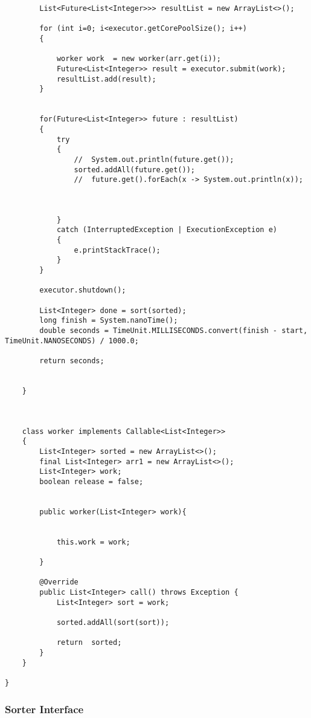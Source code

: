 \documentclass[11pt]{article}  %
\theoremstyle{definition}
\theoremstyle{remark}
\begin{document}
\begin{appendices}
\begin{lstlisting}
        List<Future<List<Integer>>> resultList = new ArrayList<>();

        for (int i=0; i<executor.getCorePoolSize(); i++)
        {

            worker work  = new worker(arr.get(i));
            Future<List<Integer>> result = executor.submit(work);
            resultList.add(result);
        }


        for(Future<List<Integer>> future : resultList)
        {
            try
            {
                //  System.out.println(future.get());
                sorted.addAll(future.get());
                //  future.get().forEach(x -> System.out.println(x));



            }
            catch (InterruptedException | ExecutionException e)
            {
                e.printStackTrace();
            }
        }

        executor.shutdown();

        List<Integer> done = sort(sorted);
        long finish = System.nanoTime();
        double seconds = TimeUnit.MILLISECONDS.convert(finish - start, TimeUnit.NANOSECONDS) / 1000.0;

        return seconds;


    }



    class worker implements Callable<List<Integer>>
    {
        List<Integer> sorted = new ArrayList<>();
        final List<Integer> arr1 = new ArrayList<>();
        List<Integer> work;
        boolean release = false;


        public worker(List<Integer> work){


            this.work = work;

        }

        @Override
        public List<Integer> call() throws Exception {
            List<Integer> sort = work;

            sorted.addAll(sort(sort));

            return  sorted;
        }
    }

}

\end{lstlisting}

\newpage
\subsubsection{Sorter Interface}\label{1} 
  \begin{lstlisting}


\end{lstlisting}
\end{appendices}
\end{document}
